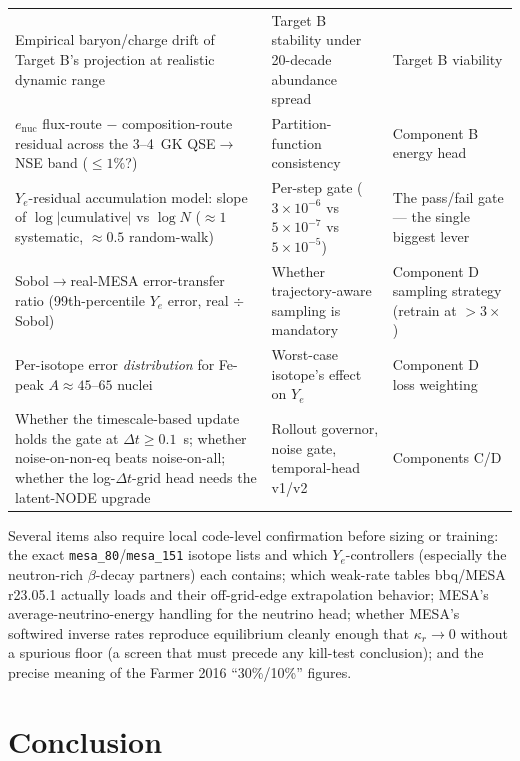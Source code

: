 \documentclass[11pt]{article}
\newcommand{\msn}[1]{\texttt{mesa\_#1}}
\newcommand{\Ye}{Y_{e}}
\newcommand{\enuc}{e_{\mathrm{nuc}}}
\begin{document}
\begin{longtable}{@{}>{\raggedright\arraybackslash}p{} >{\raggedright\arraybackslash}p{} >{\raggedright\arraybackslash}p{}@{}}
\addlinespace
Empirical baryon/charge drift of Target B's projection at realistic dynamic range & Target B stability under 20-decade abundance spread & Target B viability \\
\addlinespace
$\enuc$ flux-route $-$ composition-route residual across the 3--4~GK QSE$\to$NSE band ($\le 1\%$?) & Partition-function consistency & Component B energy head \\
\addlinespace
$\Ye$-residual accumulation model: slope of $\log|\text{cumulative}|$ vs $\log N$ ($\approx 1$ systematic, $\approx 0.5$ random-walk) & Per-step gate ($3\times10^{-6}$ vs $5\times10^{-7}$ vs $5\times10^{-5}$) & The pass/fail gate --- the single biggest lever \\
\addlinespace
Sobol$\to$real-MESA error-transfer ratio (99th-percentile $\Ye$ error, real $\div$ Sobol) & Whether trajectory-aware sampling is mandatory & Component D sampling strategy (retrain at $>3\times$) \\
\addlinespace
Per-isotope error \emph{distribution} for Fe-peak $A \approx 45$--$65$ nuclei & Worst-case isotope's effect on $\Ye$ & Component D loss weighting \\
\addlinespace
Whether the timescale-based update holds the gate at $\Delta t \ge 0.1$~s; whether noise-on-non-eq beats noise-on-all; whether the log-$\Delta t$-grid head needs the latent-NODE upgrade & Rollout governor, noise gate, temporal-head v1/v2 & Components C/D \\
\end{longtable}

Several items also require local code-level confirmation before sizing or training: the exact \msn{80}/\allowbreak\msn{151} isotope lists and which $\Ye$-controllers (especially the neutron-rich $\beta$-decay partners) each contains; which weak-rate tables bbq/MESA r23.05.1 actually loads and their off-grid-edge extrapolation behavior; MESA's average-neutrino-energy handling for the neutrino head; whether MESA's softwired inverse rates reproduce equilibrium cleanly enough that $\kappa_r \to 0$ without a spurious floor (a screen that must precede any kill-test conclusion); and the precise meaning of the Farmer 2016 ``30\%/10\%'' figures.

\section{Conclusion}
\end{document}
